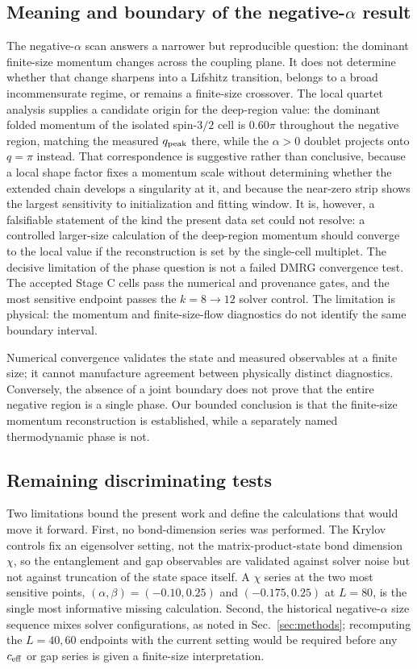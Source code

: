 \subsection{Meaning and boundary of the negative-\texorpdfstring{$\alpha$}{alpha} result}

The negative-$\alpha$ scan answers a narrower but reproducible question: the dominant finite-size momentum changes across the coupling plane.
It does not determine whether that change sharpens into a Lifshitz transition, belongs to a broad incommensurate regime, or remains a finite-size crossover.
The local quartet analysis supplies a candidate origin for the deep-region value: the dominant folded momentum of the isolated spin-$3/2$ cell is $0.60\pi$ throughout the negative region, matching the measured $q_{\mathrm{peak}}$ there, while the $\alpha>0$ doublet projects onto $q=\pi$ instead.
That correspondence is suggestive rather than conclusive, because a local shape factor fixes a momentum scale without determining whether the extended chain develops a singularity at it, and because the near-zero strip shows the largest sensitivity to initialization and fitting window.
It is, however, a falsifiable statement of the kind the present data set could not resolve: a controlled larger-size calculation of the deep-region momentum should converge to the local value if the reconstruction is set by the single-cell multiplet.
The decisive limitation of the phase question is not a failed DMRG convergence test.
The accepted Stage C cells pass the numerical and provenance gates, and the most sensitive endpoint passes the $k=8\rightarrow12$ solver control.
The limitation is physical: the momentum and finite-size-flow diagnostics do not identify the same boundary interval.

Numerical convergence validates the state and measured observables at a finite size; it cannot manufacture agreement between physically distinct diagnostics.
Conversely, the absence of a joint boundary does not prove that the entire negative region is a single phase.
Our bounded conclusion is that the finite-size momentum reconstruction is established, while a separately named thermodynamic phase is not.

\subsection{Remaining discriminating tests}

Two limitations bound the present work and define the calculations that would move it forward.
First, no bond-dimension series was performed.
The Krylov controls fix an eigensolver setting, not the matrix-product-state bond dimension $\chi$, so the entanglement and gap observables are validated against solver noise but not against truncation of the state space itself.
A $\chi$ series at the two most sensitive points, $(\alpha,\beta)=(-0.10,0.25)$ and $(-0.175,0.25)$ at $L=80$, is the single most informative missing calculation.
Second, the historical negative-$\alpha$ size sequence mixes solver configurations, as noted in Sec.~\ref{sec:methods}; recomputing the $L=40,60$ endpoints with the current setting would be required before any $c_{\mathrm{eff}}$ or gap series is given a finite-size interpretation.

